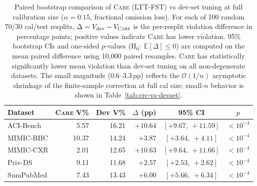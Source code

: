 \begin{table}[t]
\centering
\small
\setlength{\tabcolsep}{4pt}
\caption{Paired bootstrap comparison of \textsc{Care} (LTT-FST) vs dev-set tuning at full calibration size ($\alpha = 0.15$, fractional omission loss). For each of 100 random 70/30 cal/test resplits, $\Delta = V_{\text{dev}} - V_{\textsc{Care}}$ is the per-resplit violation difference in percentage points; positive values indicate \textsc{Care} has lower violation. 95\% bootstrap CIs and one-sided $p$-values (H$_0{:}~\mathbb{E}[\Delta] \le 0$) are computed on the mean paired difference using 10{,}000 paired resamples. \textsc{Care} has statistically significantly lower mean violation than dev-set tuning on all non-degenerate datasets. The small magnitude (0.6--3.3\,pp) reflects the $\mathcal{O}(1/n)$ asymptotic shrinkage of the finite-sample correction at full cal size; small-$n$ behavior is shown in Table~\ref{tab:crc-vs-devset}.}
\label{tab:paired-bootstrap}
\begin{tabular}{l rr rcc}
\toprule
Dataset & \textsc{Care} V\% & Dev V\% & $\Delta$ (pp) & 95\% CI & $p$ \\
\midrule
ACI-Bench & 5.57 & 16.21 & $+10.64$ & $[+9.67,\ +11.59]$ & $<10^{-4}$ \\
MIMIC-BHC & 10.37 & 14.24 & $+3.87$ & $[+3.64,\ +4.11]$ & $<10^{-4}$ \\
MIMIC-CXR & 2.01 & 12.65 & $+10.63$ & $[+9.64,\ +11.66]$ & $<10^{-4}$ \\
Priv-DS & 9.11 & 11.68 & $+2.57$ & $[+2.53,\ +2.62]$ & $<10^{-4}$ \\
SumPubMed & 7.43 & 13.43 & $+6.00$ & $[+5.66,\ +6.34]$ & $<10^{-4}$ \\
\bottomrule
\end{tabular}
\end{table}